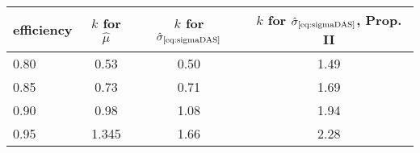 {\small
\begin{tabular}{lccc}
  \hline
efficiency & $k$ for $\hat\mu$ & $k$ for $\hat\sigma_\text{\eqref{eq:sigmaDAS}}$ & $k$ for $\hat\sigma_\text{\eqref{eq:sigmaDAS}}$, Prop. II \\ 
  \hline
  0.80 & 0.53  & 0.50 & 1.49 \\ 
  0.85 & 0.73  & 0.71 & 1.69 \\ 
  0.90 & 0.98  & 1.08 & 1.94 \\ 
  0.95 & 1.345 & 1.66 & 2.28 \\ 
   \hline
\end{tabular}
}
